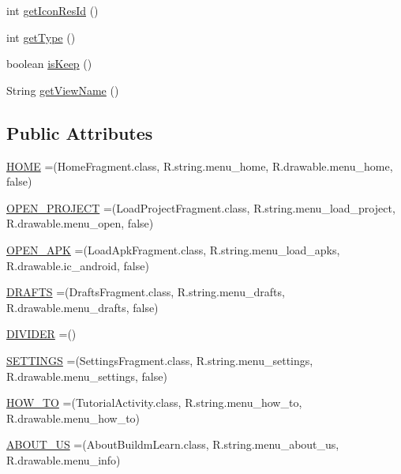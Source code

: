 \begin{DoxyCompactItemize}
\item 
int \hyperlink{enumorg_1_1buildmlearn_1_1toolkit_1_1model_1_1Section_aba7bab2bf37269948e22e2a785e753a5}{get\+Icon\+Res\+Id} ()
\item 
int \hyperlink{enumorg_1_1buildmlearn_1_1toolkit_1_1model_1_1Section_a6d0fa18c1e8ae4a33eb54acced5cfc16}{get\+Type} ()
\item 
boolean \hyperlink{enumorg_1_1buildmlearn_1_1toolkit_1_1model_1_1Section_ae9b75c2d499a28b4aa0ee59fa73810f2}{is\+Keep} ()
\item 
String \hyperlink{enumorg_1_1buildmlearn_1_1toolkit_1_1model_1_1Section_a9f3eae353cb3049fca5b6ad5628db129}{get\+View\+Name} ()
\end{DoxyCompactItemize}
\subsection*{Public Attributes}
\begin{DoxyCompactItemize}
\item 
\hyperlink{enumorg_1_1buildmlearn_1_1toolkit_1_1model_1_1Section_aa21b990b779598b93484c13cc883b2e9}{H\+O\+ME} =(Home\+Fragment.\+class, R.\+string.\+menu\+\_\+home, R.\+drawable.\+menu\+\_\+home, false)
\item 
\hyperlink{enumorg_1_1buildmlearn_1_1toolkit_1_1model_1_1Section_af342562594f60ed736f519aaa1932127}{O\+P\+E\+N\+\_\+\+P\+R\+O\+J\+E\+CT} =(Load\+Project\+Fragment.\+class, R.\+string.\+menu\+\_\+load\+\_\+project, R.\+drawable.\+menu\+\_\+open, false)
\item 
\hyperlink{enumorg_1_1buildmlearn_1_1toolkit_1_1model_1_1Section_ad2d09d4244318298218a72609159c7d2}{O\+P\+E\+N\+\_\+\+A\+PK} =(Load\+Apk\+Fragment.\+class, R.\+string.\+menu\+\_\+load\+\_\+apks, R.\+drawable.\+ic\+\_\+android, false)
\item 
\hyperlink{enumorg_1_1buildmlearn_1_1toolkit_1_1model_1_1Section_a25353ad1e6a0b4cb044bc9746cdef08b}{D\+R\+A\+F\+TS} =(Drafts\+Fragment.\+class, R.\+string.\+menu\+\_\+drafts, R.\+drawable.\+menu\+\_\+drafts, false)
\item 
\hyperlink{enumorg_1_1buildmlearn_1_1toolkit_1_1model_1_1Section_a99456d62ef2b191fe8c99efcbb6495db}{D\+I\+V\+I\+D\+ER} =()
\item 
\hyperlink{enumorg_1_1buildmlearn_1_1toolkit_1_1model_1_1Section_a6829d7052c40f9c876e0886cc093be85}{S\+E\+T\+T\+I\+N\+GS} =(Settings\+Fragment.\+class, R.\+string.\+menu\+\_\+settings, R.\+drawable.\+menu\+\_\+settings, false)
\item 
\hyperlink{enumorg_1_1buildmlearn_1_1toolkit_1_1model_1_1Section_a339a902a73ccf5feded7345c716511a9}{H\+O\+W\+\_\+\+TO} =(Tutorial\+Activity.\+class, R.\+string.\+menu\+\_\+how\+\_\+to, R.\+drawable.\+menu\+\_\+how\+\_\+to)
\item 
\hyperlink{enumorg_1_1buildmlearn_1_1toolkit_1_1model_1_1Section_abcbac90e6514bf6ed99323773f8fa5a4}{A\+B\+O\+U\+T\+\_\+\+US} =(About\+Buildm\+Learn.\+class, R.\+string.\+menu\+\_\+about\+\_\+us, R.\+drawable.\+menu\+\_\+info)
\end{DoxyCompactItemize}
